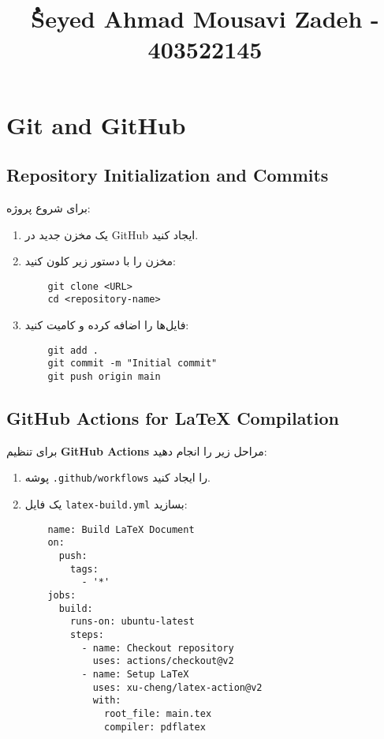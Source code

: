 \documentclass{article}
\begin{document}
\title{ُSeyed Ahmad Mousavi Zadeh - 403522145}

\section{Git and GitHub}

\subsection{Repository Initialization and Commits}
برای شروع پروژه:
\begin{enumerate}
    \item یک مخزن جدید در GitHub ایجاد کنید.
    \item مخزن را با دستور زیر کلون کنید:
    \begin{verbatim}
    git clone <URL>
    cd <repository-name>
    \end{verbatim}
    \item فایل‌ها را اضافه کرده و کامیت کنید:
    \begin{verbatim}
    git add .
    git commit -m "Initial commit"
    git push origin main
    \end{verbatim}
\end{enumerate}
\subsection{GitHub Actions for LaTeX Compilation}
برای تنظیم \textbf{GitHub Actions} مراحل زیر را انجام دهید:
\begin{enumerate}
    \item پوشه \texttt{.github/workflows} را ایجاد کنید.
    \item یک فایل \texttt{latex-build.yml} بسازید:
    \begin{verbatim}
    name: Build LaTeX Document
    on:
      push:
        tags:
          - '*'
    jobs:
      build:
        runs-on: ubuntu-latest
        steps:
          - name: Checkout repository
            uses: actions/checkout@v2
          - name: Setup LaTeX
            uses: xu-cheng/latex-action@v2
            with:
              root_file: main.tex
              compiler: pdflatex
    \end{verbatim}
\end{enumerate}
\end{document}
